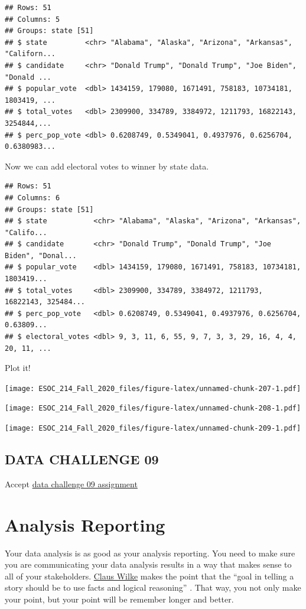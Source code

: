 \documentclass[
]{book}
\begin{document}
\begin{verbatim}
## Rows: 51
## Columns: 5
## Groups: state [51]
## $ state         <chr> "Alabama", "Alaska", "Arizona", "Arkansas", "Californ...
## $ candidate     <chr> "Donald Trump", "Donald Trump", "Joe Biden", "Donald ...
## $ popular_vote  <dbl> 1434159, 179080, 1671491, 758183, 10734181, 1803419, ...
## $ total_votes   <dbl> 2309900, 334789, 3384972, 1211793, 16822143, 3254844,...
## $ perc_pop_vote <dbl> 0.6208749, 0.5349041, 0.4937976, 0.6256704, 0.6380983...
\end{verbatim}

Now we can add electoral votes to winner by state data.

\begin{verbatim}
## Rows: 51
## Columns: 6
## Groups: state [51]
## $ state           <chr> "Alabama", "Alaska", "Arizona", "Arkansas", "Califo...
## $ candidate       <chr> "Donald Trump", "Donald Trump", "Joe Biden", "Donal...
## $ popular_vote    <dbl> 1434159, 179080, 1671491, 758183, 10734181, 1803419...
## $ total_votes     <dbl> 2309900, 334789, 3384972, 1211793, 16822143, 325484...
## $ perc_pop_vote   <dbl> 0.6208749, 0.5349041, 0.4937976, 0.6256704, 0.63809...
## $ electoral_votes <dbl> 9, 3, 11, 6, 55, 9, 7, 3, 3, 29, 16, 4, 4, 20, 11, ...
\end{verbatim}

Plot it!

\texttt{[image: ESOC\_214\_Fall\_2020\_files/figure-latex/unnamed-chunk-207-1.pdf]}

\texttt{[image: ESOC\_214\_Fall\_2020\_files/figure-latex/unnamed-chunk-208-1.pdf]}

\texttt{[image: ESOC\_214\_Fall\_2020\_files/figure-latex/unnamed-chunk-209-1.pdf]}

\hypertarget{data-challenge-09}{%
\section{DATA CHALLENGE 09}\label{data-challenge-09}}

Accept \href{}{data challenge 09 assignment}

\hypertarget{analysis-reporting}{%
\chapter{Analysis Reporting}\label{analysis-reporting}}

Your data analysis is as good as your analysis reporting. You need to make sure you are communicating your data analysis results in a way that makes sense to all of your stakeholders. \href{https://clauswilke.com/dataviz/telling-a-story.html}{Claus Wilke} makes the point that the ``goal in telling a story should be to use facts and logical reasoning'' \citep{wilke2019fundamentals}. That way, you not only make your point, but your point will be remember longer and better.
\end{document}
